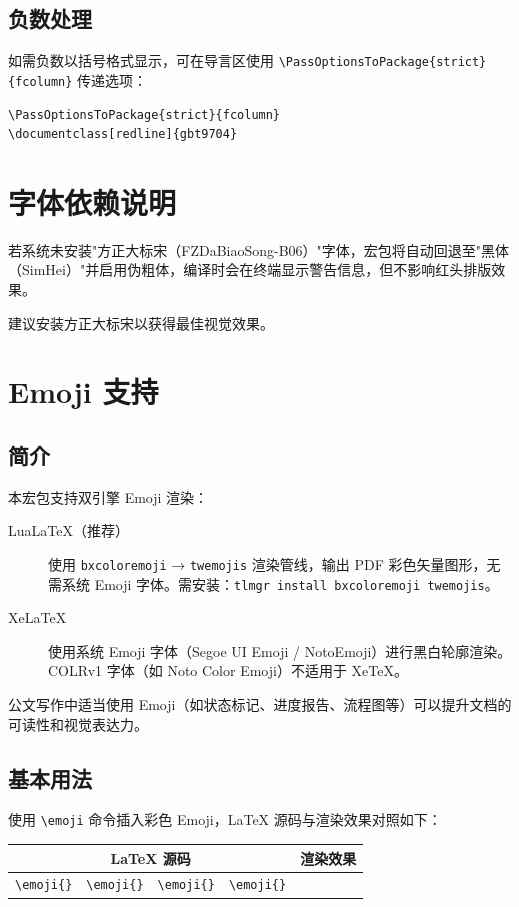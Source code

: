 \documentclass[redline, titleindent, zhlineskip]{gbt9704}
\begin{document}
\subsection{负数处理}
如需负数以括号格式显示，可在导言区使用 \verb|\PassOptionsToPackage{strict}{fcolumn}| 传递选项：

\begin{verbatim}
\PassOptionsToPackage{strict}{fcolumn}
\documentclass[redline]{gbt9704}
\end{verbatim}

\section{字体依赖说明}
若系统未安装"方正大标宋（FZDaBiaoSong-B06）"字体，宏包将自动回退至"黑体（SimHei）"并启用伪粗体，编译时会在终端显示警告信息，但不影响红头排版效果。

建议安装方正大标宋以获得最佳视觉效果。

\section{Emoji 支持}

\subsection{简介}
本宏包支持双引擎 Emoji 渲染：

\begin{description}
  \item[LuaLaTeX（推荐）] 使用 \texttt{bxcoloremoji} → \texttt{twemojis} 渲染管线，输出 PDF 彩色矢量图形，无需系统 Emoji 字体。需安装：\texttt{tlmgr install bxcoloremoji twemojis}。
  \item[XeLaTeX] 使用系统 Emoji 字体（Segoe UI Emoji / NotoEmoji）进行黑白轮廓渲染。COLRv1 字体（如 Noto Color Emoji）不适用于 XeTeX。
\end{description}

公文写作中适当使用 Emoji（如状态标记、进度报告、流程图等）可以提升文档的可读性和视觉表达力。

\subsection{基本用法}

使用 \verb|\emoji| 命令插入彩色 Emoji，LaTeX 源码与渲染效果对照如下：

\begin{center}
\renewcommand{\arraystretch}{1.6}
\begin{tabular}{p{6.5cm} p{4.5cm}}
\toprule
\multicolumn{1}{c}{\textbf{LaTeX 源码}} & \multicolumn{1}{c}{\textbf{渲染效果}} \\
\midrule
\raggedright
\texttt{\textbackslash emoji\{}\emoji{👍}\texttt{\}}\ \
\texttt{\textbackslash emoji\{}\emoji{🎉}\texttt{\}}\ \
\texttt{\textbackslash emoji\{}\emoji{📄}\texttt{\}}\ \
\texttt{\textbackslash emoji\{}\emoji{✅}\texttt{\}}
& \emoji{👍} \emoji{🎉} \emoji{📄} \emoji{✅} \\[4pt]
\bottomrule
\end{tabular}
\end{center}
\end{document}
